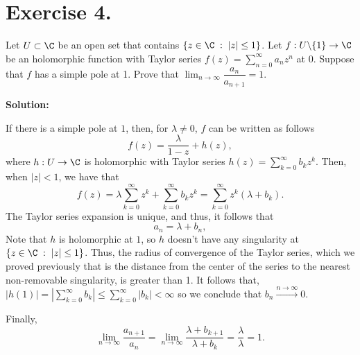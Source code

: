 \section*{Exercise 4.}

Let $U \subset \C$ be an open set that contains $\{ z\in \C \;:\; |z| \leq 1 \}$. Let $f : U \backslash \{1\} \to \C$ be an holomorphic function with Taylor series $f(z) = \sum_{n = 0}^{\infty} a_n z^n$ at 0. Suppose that $f$ has a simple pole at 1. Prove that $\lim_{n\to\infty} \dfrac{a_n}{a_{n+1}} = 1$.

\textbf{Solution:}

If there is a simple pole at $1$, then, for $\lambda \neq 0$, $f$ can be written as follows
\[ f(z) = \frac{\lambda}{1-z} + h(z), \]
where $h: U \to \C$ is holomorphic with Taylor series $h(z) = \sum_{k = 0}^{\infty} b_k z^k$. Then, when $|z| < 1$, we have that
\[ f(z) = \lambda \sum_{k = 0}^{\infty} z^k + \sum_{k = 0}^{\infty} b_k z^k = \sum_{k = 0}^{\infty} z^k \left( \lambda + b_k \right). \]
The Taylor series expansion is unique, and thus, it follows that
\[ a_n = \lambda + b_n, \]
Note that $h$ is holomorphic at $1$, so $h$ doesn't have any singularity at $\{ z\in \C \;:\; |z| \leq 1 \}$. Thus, the radius of convergence of the Taylor series, which we proved previously that is the distance from the center of the series to the nearest non-removable singularity, is greater than 1. It follows that, $|h(1)| = \left| \sum_{k = 0}^{\infty} b_k \right| \leq \sum_{k = 0}^{\infty} |b_k| < \infty$ so we conclude that $b_n \overset{n\to\infty}{\to} 0$.

Finally,
\[ \lim_{n\to \infty} \frac{a_{n+1}}{a_{n}} = \lim_{n\to \infty} \frac{\lambda + b_{k+1}}{\lambda + b_{k}} = \frac{\lambda}{\lambda} = 1. \]